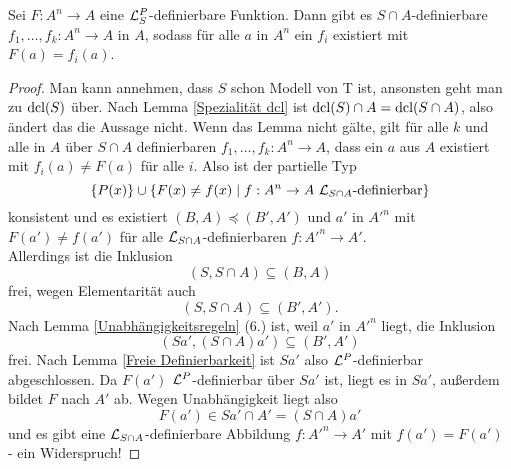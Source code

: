 \begin{lemma}
	Sei $F:A^n\rightarrow A$ eine $\mathcal{L}^P_S$-definierbare Funktion. Dann gibt es $S\cap A$-definierbare $f_1,\dots,f_k:A^n\rightarrow A$ in $A$, sodass für alle $a$ in $A^n$ ein $f_i$ existiert mit $F(a)=f_i(a)$.
\end{lemma}
\begin{proof}
	Man kann annehmen, dass $S$ schon Modell von T ist, ansonsten geht man zu $\operatorname{dcl}(S)$ über. Nach Lemma \ref{Spezialität dcl} ist $\operatorname{dcl}(S)\cap A=\operatorname{dcl}(S\cap A)$, also ändert das die Aussage nicht.\newpage
	Wenn das Lemma nicht gälte, gilt für alle $k$ und alle in $A$ über $S\cap A$ definierbaren $f_1,\dots,f_k:A^n\rightarrow A$, dass ein $a$ aus $A$ existiert mit $f_i(a)\neq F(a)$ für alle $i$. Also ist der partielle Typ $$\{P(x)\}\cup\{F(x)\neq f(x)\mid f:A^n\rightarrow A\ \mathcal{L}_{S\cap A}\text{-definierbar}\}$$ konsistent und es existiert $(B,A)\preceq(B',A')$ und $a'$ in $A'^n$ mit $F(a')\neq f(a')$ für alle $\mathcal{L}_{S\cap A}$-definierbaren $f:A'^n\rightarrow A'$.\\
	Allerdings ist die Inklusion $$(S,S\cap A)\subseteq (B,A)$$ frei, wegen Elementarität auch $$(S,S\cap A)\subseteq (B',A').$$ Nach Lemma \ref{Unabhängigkeitsregeln} (6.) ist, weil $a'$ in $A'^n$ liegt, die Inklusion $$(Sa',(S\cap A)a')\subseteq(B',A')$$ frei. Nach Lemma \ref{Freie Definierbarkeit} ist $Sa'$ also $\mathcal{L}^P$-definierbar abgeschlossen. Da $F(a')$ $\mathcal{L}^P$-definierbar über $Sa'$ ist, liegt es in $Sa'$, außerdem bildet $F$ nach $A'$ ab. Wegen Unabhängigkeit liegt also $$F(a')\in Sa'\cap A'=(S\cap A)a'$$ und es gibt eine $\mathcal{L}_{S\cap A}$-definierbare Abbildung $f:A'^n\rightarrow A'$ mit $f(a')=F(a')$ - ein Widerspruch!
\end{proof}

